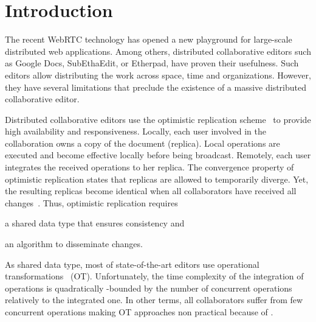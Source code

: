 
\section{Introduction}

The recent WebRTC technology has opened a new playground for large-scale
distributed web applications. Among others, distributed collaborative editors
such as Google Docs, SubEthaEdit, or Etherpad, have proven their
usefulness. Such editors allow distributing the work across space, time and
organizations. However, they have several limitations that preclude the
existence of a massive distributed collaborative editor. 


Distributed collaborative editors use the optimistic replication
scheme~\cite{johnson1975maintenance, saito2005optimistic} to provide high
availability and responsiveness. Locally, each user involved in the
collaboration owns a copy of the document (replica). Local operations are
executed and become effective locally before being broadcast. Remotely, each
user integrates the received operations to her replica. The convergence property
of optimistic replication states that replicas are allowed to temporarily
diverge. Yet, the resulting replicas become identical when all collaborators
have received all changes~\cite{demers1987epidemic}.  Thus, optimistic
replication requires
\begin{inparaenum}[(i)]
\item a shared data type that ensures
  consistency and
\item an algorithm to disseminate changes.
\end{inparaenum}

As shared data type, most of state-of-the-art editors use operational
transformations~\cite{sun1998operational, sun2009contextbased}
(OT). Unfortunately, the time complexity of the integration of operations is
quadratically -bounded by the number of concurrent operations
relatively to the integrated one. In other terms, all collaborators suffer from
few concurrent operations making OT approaches non practical because of
.

